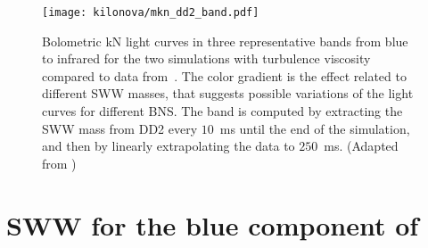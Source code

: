 
\begin{figure}[t]
    \centering
    \texttt{[image: kilonova/mkn\_dd2\_band.pdf]}
    \caption{Bolometric kN light curves in three representative bands from blue to
        infrared for the two simulations with turbulence viscosity compared to
        \AT{} data from~\citep{Villar:2017wcc}.
        The color gradient is the effect related to different
        \ac{SWW} masses, that suggests possible variations of the light
        curves for different \ac{BNS}. The band is computed by extracting the
        \ac{SWW} mass from DD2 every $10$~ms until the end of the simulation, and
        then by linearly extrapolating the data to $250$~ms.
        (Adapted from \citet{Nedora:2019jhl})
    }
    \label{fig:knlc}
\end{figure}

\section{\ac{SWW} for the blue component of \AT{}}\label{sec:kilonova:result}

